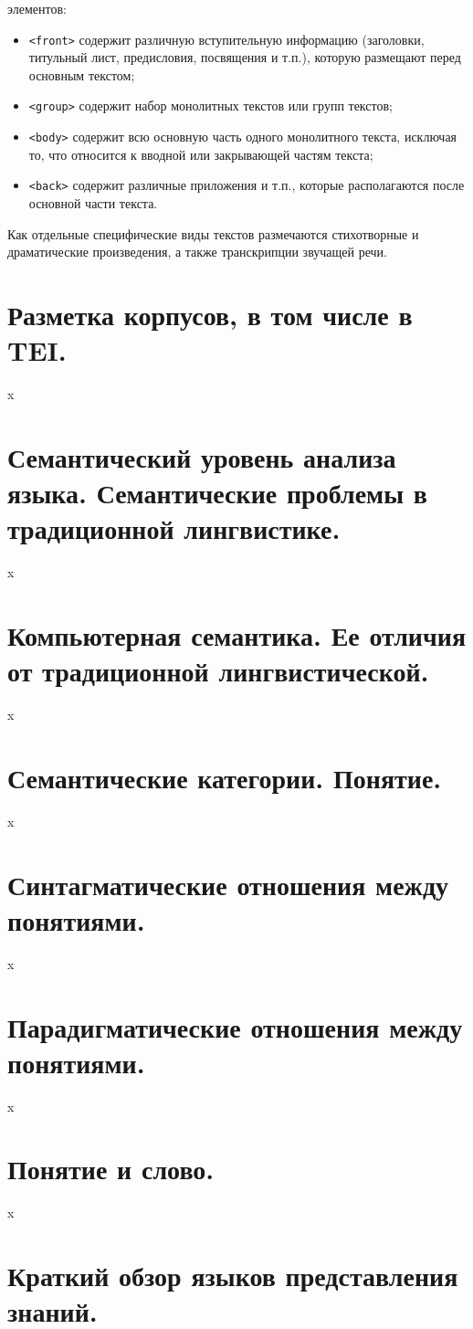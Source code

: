 \documentclass[12pt]{article}
\theoremstyle{definition}
\theoremstyle{remark}
\numberwithin{equation}{section}
\begin{document}
элементов:
\begin{itemize}
\item \texttt{<front>} содержит различную вступительную информацию (заголовки, титульный лист,
предисловия, посвящения и т.п.), которую размещают перед основным текстом;
\item \texttt{<group>} содержит набор монолитных текстов или групп текстов;
\item \texttt{<body>} содержит всю основную часть одного монолитного текста, исключая то, что
относится к вводной или закрывающей частям текста;
\item \texttt{<back>} содержит различные приложения и т.п., которые располагаются после основной
части текста.
\end{itemize}
Как отдельные специфические виды текстов размечаются стихотворные и драматические произведения, а также транскрипции звучащей речи.

\section{Разметка корпусов, в том числе в TEI.}
x
\section{Семантический уровень анализа языка. Семантические проблемы в традиционной лингвистике.}
x
\section{Компьютерная семантика. Ее отличия от традиционной лингвистической.}
x
\section{Семантические категории. Понятие.}
x
\section{Синтагматические отношения между понятиями.}
x
\section{Парадигматические отношения между понятиями.} 
x
\section{Понятие и слово.}
x
\section{Краткий обзор языков представления знаний.}
\end{document}
